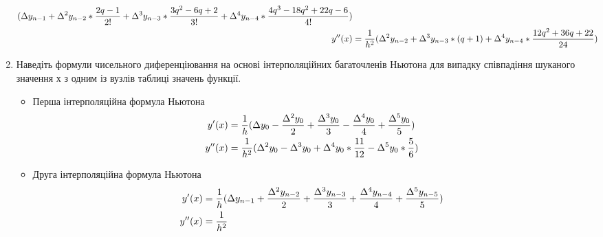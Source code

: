 \begin{enumerate}
\begin{align}
              ( \Delta                     y_{n - 1}
              + \Delta \textsuperscript{2} y_{n - 2} * \frac{2q - 1}{2!}
              + \Delta \textsuperscript{3} y_{n - 3} * \frac{3q^2 - 6q + 2}{3!}
              + \Delta \textsuperscript{4} y_{n - 4} * \frac{4q^3 - 18q^2 + 22q - 6}{4!} ) \\
              y''(x) & = \frac{1}{h^2}
              ( \Delta \textsuperscript{2} y_{n - 2}
              + \Delta \textsuperscript{3} y_{n - 3} * (q + 1)
              + \Delta \textsuperscript{4} y_{n - 4} * \frac{12q^2 + 36q + 22}{24} )
          \end{align}
    \item Наведіть формули чисельного диференціювання
          на основі інтерполяційних багаточленів Ньютона
          для випадку співпадіння шуканого значення х з одним
          із вузлів таблиці значень функції.
          \begin{itemize}
              \item Перша інтерполяційна формула Ньютона
                    \begin{align}
                        y'(x)  & = \frac{1}{h}
                        (       \Delta                     y_0
                        - \frac{\Delta \textsuperscript{2} y_0}{2}
                        + \frac{\Delta \textsuperscript{3} y_0}{3}
                        - \frac{\Delta \textsuperscript{4} y_0}{4}
                        + \frac{\Delta \textsuperscript{5} y_0}{5} ) \\
                        y''(x) & = \frac{1}{h^2}
                        ( \Delta \textsuperscript{2} y_0
                        - \Delta \textsuperscript{3} y_0
                        + \Delta \textsuperscript{4} y_0 * \frac{11}{12}
                        - \Delta \textsuperscript{5} y_0 * \frac{5}{6} )
                    \end{align}
              \item Друга інтерполяційна формула Ньютона
                    \begin{align}
                        y'(x)  & = \frac{1}{h}
                        (       \Delta                     y_{n - 1}
                        + \frac{\Delta \textsuperscript{2} y_{n - 2}}{2}
                        + \frac{\Delta \textsuperscript{3} y_{n - 3}}{3}
                        + \frac{\Delta \textsuperscript{4} y_{n - 4}}{4}
                        + \frac{\Delta \textsuperscript{5} y_{n - 5}}{5} ) \\
                        y''(x) & = \frac{1}{h^2}

\end{align}
\end{itemize}
\end{enumerate}
